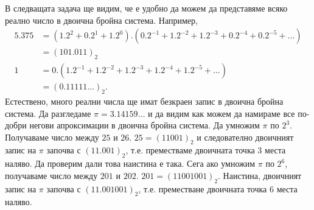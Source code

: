В следващата задача ще видим, че е удобно да можем да представяме 
всяко реално число в двоична бройна система.
Например,
\begin{align*}
  5.375 & = (1.2^2 + 0.2^1 + 1.2^0).(0.2^{-1} + 1.2^{-2} + 1.2^{-3} + 0.2^{-4} + 0.2^{-5} + \dots)\\
  & = (101.011)_2\\
  1 & = 0.(1.2^{-1} + 1.2^{-2} + 1.2^{-3} + 1.2^{-4} + 1.2^{-5} + \dots)\\
  & = (0.11111\dots)_2.
\end{align*}
Естествено, много реални числа ще имат безкраен запис в двоична бройна система.
Да разгледаме $\pi = 3.14159\dots$ и да видим как можем да намираме все по-добри негови 
апроксимации в двоична бройна система.
Да умножим $\pi$ по $2^3$. Получаваме число между $25$ и $26$. 
$25 = (11001)_2$ и следователно двоичният запис на $\pi$ започва с $(11.001)_2$, т.е.
преместваме двоичната точка $3$ места наляво. Да проверим дали това наистина е така.
Сега ако умножим $\pi$ по $2^6$, получаваме число между $201$ и $202$.
$201 = (11001001)_2$. Наистина, двоичният запис на $\pi$ започва с $(11.001001)_2$,
т.е. преместване двоичната точка $6$ места наляво.

  
